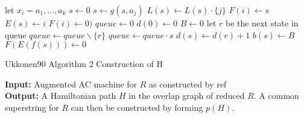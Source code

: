 \documentclass[english,twoside,censored,csm,algorithms-track-2020]{HYthesisML}
\theoremstyle{plain}
\theoremstyle{definition}
\begin{document}
\begin{lemma}[]
\begin{algorithm}
    \begin{algorithmic}[1]
          \hspace*{\algorithmicindent} let $x_i = a_1,...,a_k$
          \State $s\gets 0$
            \State $s\gets g(s,a_j)$
            \State $L(s)\gets L(s) \cdot \{j\}$
              \State $F(i)\gets s$
              \State $E(s)\gets i$
                \State $F(i)\gets 0)$
              \EndIf
            \EndIf
          \EndFor
        \EndFor
        \State $queue\gets 0$
        \State $d(0)\gets 0$
        \State $B\gets 0$
          \hspace*{\algorithmicindent} let $r$ be the next state in queue
          \State $queue\gets queue \backslash \{r\}$
            \State $queue\gets queue\cdot s$
            \State $d(s)\gets d(r)+1$
            \State $b(s)\gets B$
            \State $F(E(f(s)))\gets 0$
          \EndFor
        \EndWhile
      \EndFunction
        
    \end{algorithmic}
  \end{algorithm}

  \begin{algorithm}
    \caption{Ukkonen90 Algorithm 2 Construction of H} \label{ukk-h}
    \hspace*{\algorithmicindent} \textbf{Input:} Augmented AC machine for $R$ as constructed by ref\\ %
    \hspace*{\algorithmicindent} \textbf{Output:} A Hamiltonian path $H$ in the overlap graph of reduced $R$. A common superstring for $R$ can then be constructed by forming $p(H)$.\\


\end{algorithm}
\end{lemma}
\end{document}
